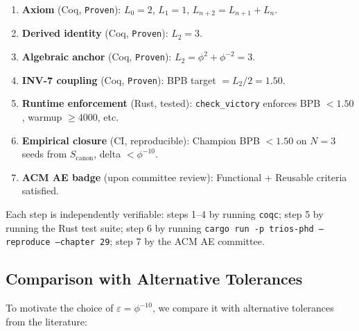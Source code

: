 \begin{enumerate}
  \item \textbf{Axiom} (Coq, \texttt{Proven}):
        $L_0 = 2$, $L_1 = 1$, $L_{n+2} = L_{n+1} + L_n$.
  \item \textbf{Derived identity} (Coq, \texttt{Proven}):
        $L_2 = 3$.
  \item \textbf{Algebraic anchor} (Coq, \texttt{Proven}):
        $L_2 = \phi^2 + \phi^{-2} = 3$.
  \item \textbf{INV-7 coupling} (Coq, \texttt{Proven}):
        BPB target $= L_2 / 2 = 1.50$.
  \item \textbf{Runtime enforcement} (Rust, tested):
        \texttt{check\_victory} enforces BPB $< 1.50$,
        warmup $\ge 4000$, etc.
  \item \textbf{Empirical closure} (CI, reproducible):
        Champion BPB $< 1.50$ on $N = 3$ seeds from
        $S_{\mathrm{canon}}$, delta $< \phi^{-10}$.
  \item \textbf{ACM AE badge} (upon committee review):
        Functional + Reusable criteria satisfied.
\end{enumerate}

\noindent
Each step is independently verifiable: steps 1--4 by running
\texttt{coqc}; step 5 by running the Rust test suite; step 6 by
running \texttt{cargo run -p trios-phd -- reproduce --chapter 29};
step 7 by the ACM AE committee.

\subsection{Comparison with Alternative Tolerances}

To motivate the choice of $\varepsilon = \phi^{-10}$, we compare
it with alternative tolerances from the literature:

\begin{table}[h]
\centering
\caption{Reproduction Tolerance Comparison}
\label{tab:29-tolerance}
\end{table}

